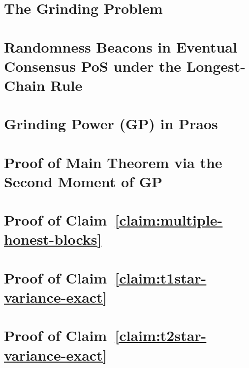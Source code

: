 


\chapter{The Grinding Problem}\label{ch:grinding-intro}


\chapter{Randomness Beacons in Eventual Consensus PoS under the Longest-Chain Rule}\label{sec:model-grinding}


% 

\chapter{Grinding Power (GP) in Praos}\label{sec:praos}



\chapter{Proof of Main Theorem via the Second Moment of GP}\label{sec:praos-second-moment}\label{sec:main-theorems}




\chapter{Proof of Claim~\ref{claim:multiple-honest-blocks}}\label{sec:praos-claim-multiple-honest-blocks}



\chapter{Proof of Claim~\ref{claim:t1star-variance-exact}}\label{sec:praos-claim-t1star-variance-exact}



\chapter{Proof of Claim~\ref{claim:t2star-variance-exact}}\label{sec:praos-claim-t2star-variance-exact}




